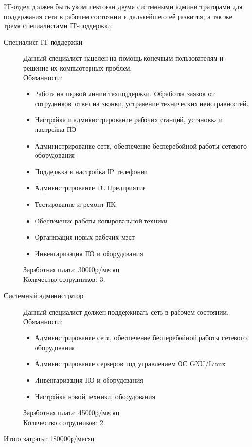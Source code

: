 IT-отдел должен быть укомплектован двумя системными администраторами для поддержания сети в рабочем состоянии и дальнейшего её развития, а так же тремя специалистами IT-поддержки.

\begin{description}
\item[Специалист IT-поддержки] Данный специалист нацелен на помощь конечным пользователям и решение их компьютерных проблем.\\
  Обязанности:
  \begin{itemize}
  \item Работа на первой линии техподдержки. Обработка заявок от сотрудников, ответ на звонки, устранение технических неисправностей. 
  \item Настройка и администрирование рабочих станций, установка и настройка ПО
  \item Администрирование сети, обеспечение бесперебойной работы сетевого оборудования
  \item Поддержка и настройка IP телефонии
  \item Администрирование 1С Предприятие
  \item Тестирование и ремонт ПК
  \item Обеспечение работы копировальной техники
  \item Организация новых рабочих мест
  \item Инвентаризация ПО и оборудования
  \end{itemize}

  Заработная плата: 30000р/месяц\\
  Количество сотрудников: 3.
\item[Системный администратор] Данный специалист должен поддерживать сеть в рабочем состоянии. \\
  Обязанности:
  \begin{itemize}
  \item Администрирование сети, обеспечение бесперебойной работы сетевого оборудования
  \item Администрирование серверов под управлением ОС GNU/Linux
  \item Инвентаризация ПО и оборудования
  \item Настройка новой техники, оборудования
  \end{itemize}
  Заработная плата: 45000р/месяц\\
  Количество сотрудников: 2.
\end{description}

Итого затраты: 180000р/месяц

